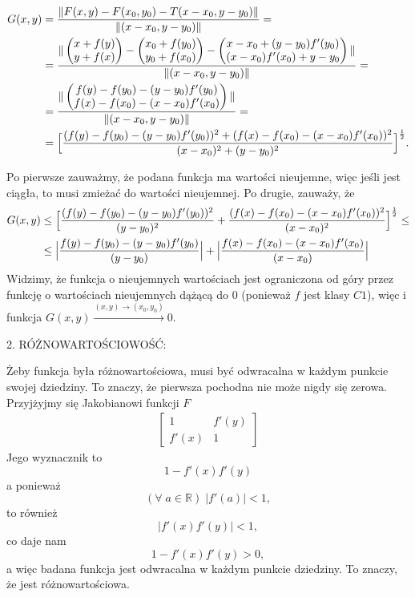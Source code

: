 \documentclass{article}[13pt]
\newcommand{\R}{\mathds{R}}
\begin{document}
\begin{align*}
    G(x,y)&={\|F(x,y)-F(x_0,y_0)-T(x-x_0,y-y_0)\|\over\|(x-x_0,y-y_0)\|}=\\
    &={\|
        \begin{pmatrix}x+f(y)\\y+f(x)\end{pmatrix}
        -\begin{pmatrix}x_0+f(y_0)\\y_0+f(x_0)\end{pmatrix}-
        \begin{pmatrix}
            x-x_0+(y-y_0)f'(y_0)\\
            (x-x_0)f'(x_0)+y-y_0
        \end{pmatrix}
    \|\over\|(x-x_0,y-y_0)\|}=\\
    &={\|
        \begin{pmatrix}
            f(y)-f(y_0)-(y-y_0)f'(y_0)\\
            f(x)-f(x_0)-(x-x_0)f'(x_0)
        \end{pmatrix}
        \|\over
        \|(x-x_0,y-y_0)\|
    }=\\
    &=\Big[{{(f(y)-f(y_0)-(y-y_0)f'(y_0))^2+(f(x)-f(x_0)-(x-x_0)f'(x_0))^2\over(x-x_0)^2+(y-y_0)^2}}\Big]^\frac12.
\end{align*}

Po pierwsze zauważmy, że podana funkcja ma wartości nieujemne, więc jeśli jest ciągła, to musi zmieżać do wartości nieujemnej. Po drugie, zauważy, że
\begin{align*}
    G(x,y)&\leq\Big[{(f(y)-f(y_0)-(y-y_0)f'(y_0))^2\over(y-y_0)^2}+{(f(x)-f(x_0)-(x-x_0)f'(x_0))^2\over(x-x_0)^2}\Big]^\frac12\leq\\
    &\leq \Big|{f(y)-f(y_0)-(y-y_0)f'(y_0)\over(y-y_0)}\Big|+\Big|{f(x)-f(x_0)-(x-x_0)f'(x_0)\over(x-x_0)}\Big|
\end{align*}
Widzimy, że funkcja o nieujemnych wartościach jest ograniczona od góry przez funkcję o wartościach nieujemnych dążącą do 0 (ponieważ $f$ jest klasy $C1$), więc i funkcja $G(x,y)\xrightarrow{(x,y)\to(x_0,y_0)}0$.

\medskip


{\color{red}2. RÓŻNOWARTOŚCIOWOŚĆ:}
\medskip

Żeby funkcja była różnowartościowa, musi być odwracalna w każdym punkcie swojej dziedziny. To znaczy, że pierwsza pochodna nie może nigdy się zerowa. Przyjżyjmy się Jakobianowi funkcji $F$
\begin{align*}
    \begin{bmatrix}
        1 & f'(y)\\
        f'(x) & 1
    \end{bmatrix}
\end{align*}
Jego wyznacznik to 
$$1-f'(x)f'(y)$$
a ponieważ 
$$(\forall\;a\in\R)\;|f'(a)|<1,$$
to również
$$|f'(x)f'(y)|<1,$$
co daje nam 
$$1-f'(x)f'(y)>0,$$
a więc badana funkcja jest odwracalna w każdym punkcie dziedziny. To znaczy, że jest różnowartościowa.
\medskip
\end{document}
